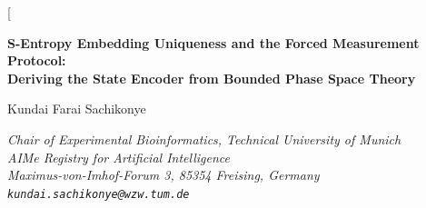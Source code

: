 \documentclass[11pt,twocolumn,a4paper]{article}
\theoremstyle{definition}
\theoremstyle{remark}
\begin{document}
\twocolumn[
\begin{@twocolumnfalse}
\begin{center}

{\LARGE\bfseries S-Entropy Embedding Uniqueness and the Forced Measurement Protocol:\\[4pt]
Deriving the State Encoder from Bounded Phase Space Theory}

\vspace{12pt}

{\large Kundai Farai Sachikonye}

\vspace{6pt}

{\small\itshape Chair of Experimental Bioinformatics, Technical University of Munich \\[0.3em]
\small\itshape AIMe Registry for Artificial Intelligence \\[0.2em]
\small\itshape Maximus-von-Imhof-Forum 3, 85354 Freising, Germany \\[0.2em]
\texttt{kundai.sachikonye@wzw.tum.de}}

\vspace{6pt}{\small May 2026}

\vspace{16pt}


\end{center}
\end{@twocolumnfalse}
\end{document}
